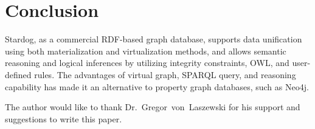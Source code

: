 \section{Conclusion}
\label{s:conclusion}
	Stardog, as a commercial RDF-based graph database, supports data 
	unification using both materialization and virtualization methods, and 
	allows semantic reasoning and logical inferences by utilizing integrity 
	constraints, OWL, and user-defined rules. The advantages of virtual 
	graph, SPARQL query, and reasoning capability has made it an alternative 
	to property graph databases, such as Neo4j. 


\begin{acks}

  The author would like to thank Dr.~Gregor~von~Laszewski for his
  support and suggestions to write this paper.

\end{acks}


 

